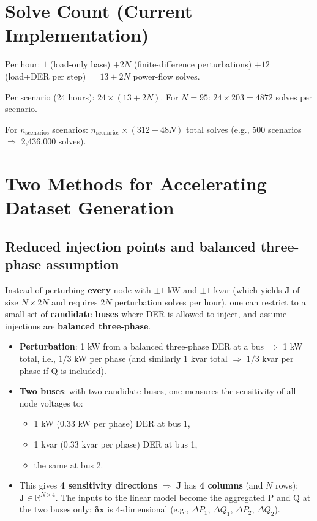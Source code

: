 \documentclass[11pt]{article}
\begin{document}
\section{Solve Count (Current Implementation)}

Per hour: $1$ (load-only base) $+ 2N$ (finite-difference perturbations) $+ 12$ (load+DER per step) $= 13 + 2N$ power-flow solves.

Per scenario (24 hours): $24 \times (13 + 2N)$. For $N=95$: $24 \times 203 = 4872$ solves per scenario.

For $n_{\mathrm{scenarios}}$ scenarios: $n_{\mathrm{scenarios}} \times (312 + 48N)$ total solves (e.g., 500 scenarios $\Rightarrow$ 2,436,000 solves).

\section{Two Methods for Accelerating Dataset Generation}

\subsection{Reduced injection points and balanced three-phase assumption}

Instead of perturbing \textbf{every} node with $\pm 1$ kW and $\pm 1$ kvar (which yields $\mathbf{J}$ of size $N \times 2N$ and requires $2N$ perturbation solves per hour), one can restrict to a small set of \textbf{candidate buses} where DER is allowed to inject, and assume injections are \textbf{balanced three-phase}.

\begin{itemize}[noitemsep]
  \item \textbf{Perturbation}: 1 kW from a balanced three-phase DER at a bus $\Rightarrow$ 1 kW total, i.e., $1/3$ kW per phase (and similarly 1 kvar total $\Rightarrow$ $1/3$ kvar per phase if Q is included).
  \item \textbf{Two buses}: with two candidate buses, one measures the sensitivity of all node voltages to:
  \begin{itemize}[noitemsep]
    \item 1 kW ($0.33$ kW per phase) DER at bus 1,
    \item 1 kvar ($0.33$ kvar per phase) DER at bus 1,
    \item the same at bus 2.
  \end{itemize}
  \item This gives \textbf{4 sensitivity directions} $\Rightarrow$ $\mathbf{J}$ has \textbf{4 columns} (and $N$ rows): $\mathbf{J} \in \mathbb{R}^{N \times 4}$. The inputs to the linear model become the aggregated P and Q at the two buses only; $\boldsymbol{\delta}\mathbf{x}$ is 4-dimensional (e.g., $\Delta P_1$, $\Delta Q_1$, $\Delta P_2$, $\Delta Q_2$).
\end{itemize}
\end{document}
